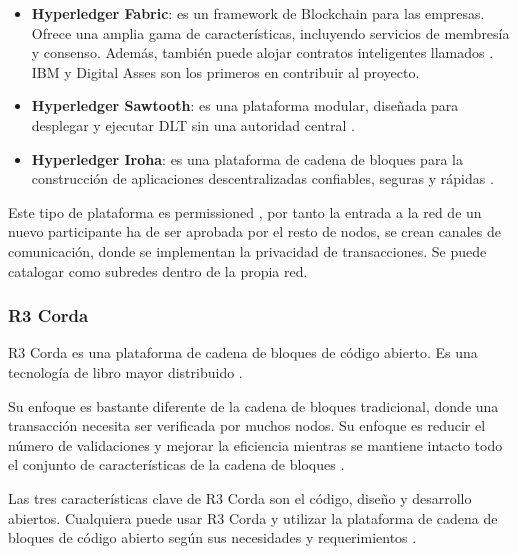 \begin{itemize}
    \item \textbf{Hyperledger Fabric}: es un framework de Blockchain para las empresas. Ofrece una amplia gama de 
    características, incluyendo servicios de membresía y consenso. Además, también puede alojar contratos inteligentes 
    llamados . IBM y Digital Asses son los primeros en contribuir al proyecto.
    \item \textbf{Hyperledger Sawtooth}: es una plataforma modular, diseñada para desplegar y ejecutar DLT sin una
    autoridad central \cite{top-blockchain-platforms-app2}.
    \item \textbf{Hyperledger Iroha}: es una plataforma de cadena de bloques para la construcción de aplicaciones 
    descentralizadas confiables, seguras y rápidas \cite{top-blockchain-platforms-app2}.
\end{itemize}

\noindent Este tipo de plataforma es permissioned \cite{public-private-blockchain, top-blockchain-platforms-app2}, 
por tanto la entrada a la red de un nuevo participante ha de ser aprobada por el resto de nodos, se crean canales de 
comunicación, donde se implementan la privacidad de transacciones. Se puede catalogar como subredes dentro de la propia 
red.

\subsubsection*{R3 Corda}

R3 Corda es una plataforma de cadena de bloques de código abierto. Es una tecnología de libro mayor distribuido 
\cite{top-blockchain-platforms-app}.

\vspace{5mm}

\noindent Su enfoque es bastante diferente de la cadena de bloques tradicional, donde una transacción necesita ser 
verificada por muchos nodos. Su enfoque es reducir el número de validaciones y mejorar la eficiencia mientras se 
mantiene intacto todo el conjunto de características de la cadena de bloques \cite{top-blockchain-platforms-app}.

\vspace{5mm}

\noindent Las tres características clave de R3 Corda son el código, diseño y desarrollo abiertos. Cualquiera puede usar 
R3 Corda y utilizar la plataforma de cadena de bloques de código abierto según sus necesidades y requerimientos 
\cite{top-blockchain-platforms-app}. 

